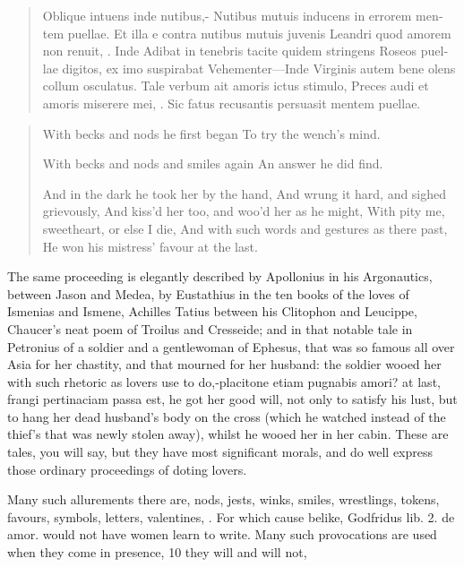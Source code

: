 \begin{latin}
\begin{verse}
Oblique intuens inde nutibus,-
Nutibus mutuis inducens in errorem mentem puellae.
Et illa e contra nutibus mutuis juvenis
Leandri quod amorem non renuit, \etc{}. Inde
Adibat in tenebris tacite quidem stringens
Roseos puellae digitos, ex imo suspirabat
Vehementer---Inde
Virginis autem bene olens collum osculatus.
Tale verbum ait amoris ictus stimulo,
Preces audi et amoris miserere mei,  \etc{}.
Sic fatus recusantis persuasit mentem puellae.
\end{verse}
\end{latin}
\translationrule%
\begin{verse}%
With becks and nods he first began
To try the wench's mind.

With becks and nods and smiles again
An answer he did find.

And in the dark he took her by the hand,
And wrung it hard, and sighed grievously,
And kiss'd her too, and woo'd her as he might,
With pity me, sweetheart, or else I die,
And with such words and gestures as there past,
He won his mistress' favour at the last.
\end{verse}%

The same proceeding is elegantly described by Apollonius in his
Argonautics, between Jason and Medea, by Eustathius in the ten books of
the loves of Ismenias and Ismene, Achilles Tatius between his Clitophon
and Leucippe, Chaucer's neat poem of Troilus and Cresseide; and in that
notable tale in Petronius of a soldier and a gentlewoman of Ephesus,
that was so famous all over Asia for her chastity, and that mourned for
her husband: the soldier wooed her with such rhetoric as lovers use to
do,-placitone etiam pugnabis amori? \etc{} at last, frangi pertinaciam
passa est, he got her good will, not only to satisfy his lust,
but to hang her dead husband's body on the cross (which he
watched instead of the thief's that was newly stolen away), whilst he
wooed her in her cabin. These are tales, you will say, but they have
most significant morals, and do well express those ordinary proceedings
of doting lovers.

Many such allurements there are, nods, jests, winks, smiles,
wrestlings, tokens, favours, symbols, letters, valentines, \etc{}. For
which cause belike, Godfridus lib. 2. de amor. would not have women
learn to write. Many such provocations are used when they come in
presence, 10 they will and will not,

